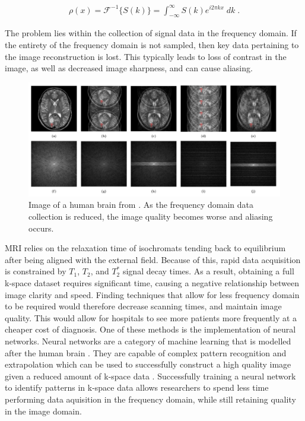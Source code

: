 \documentclass[14pt]{extreport}
\begin{document}
        \begin{align}
            \rho(x) = \mathcal{F}^{-1}\{ S(k) \} = \int_{-\infty}^{\infty} S(k) e^{i 2\pi k x} \;dk\;. \label{fft}
        \end{align}

        The problem lies within the collection of signal data in the frequency domain. If the entirety of the frequency domain is not sampled, then key data pertaining to the image reconstruction is lost. This typically leads to loss of contrast in the image, as well as decreased image sharpness, and can cause aliasing. 
        
        \begin{figure}[h]
            \begin{center}
                \includegraphics[width = \linewidth]{Brain Images.png}
                \caption{Image of a human brain from \cite{Hyun_Kim_Lee_Lee_Seo_2018}. As the frequency domain data collection is reduced, the image quality becomes worse and aliasing occurs.}
            \end{center}
        \end{figure}

        MRI relies on the relaxation time of isochromats tending back to equilibrium after being aligned with the external field. Because of this, rapid data acquisition is constrained by $T_1$, $T_2$, and $T_2^*$ signal decay times. As a result, obtaining a full k-space dataset requires significant time, causing a negative relationship between image clarity and speed. Finding techniques that allow for less frequency domain to be required would therefore decrease scanning times, and maintain image quality. This would allow for hospitals to see more patients more frequently at a cheaper cost of diagnosis. One of these methods is the implementation of neural networks. Neural networks are a category of machine learning that is modelled after the human brain \cite{Pytorch_Book}. They are capable of complex pattern recognition and extrapolation which can be used to successfully construct a high quality image given a reduced amount of k-space data \cite{Hammernik_Klatzer_Kobler_Recht_Sodickson_Pock_Knoll_2018}. Successfully training a neural network to identify patterns in k-space data allows researchers to spend less time performing data aquisition in the frequency domain, while still retaining quality in the image domain.
    
\end{document}
